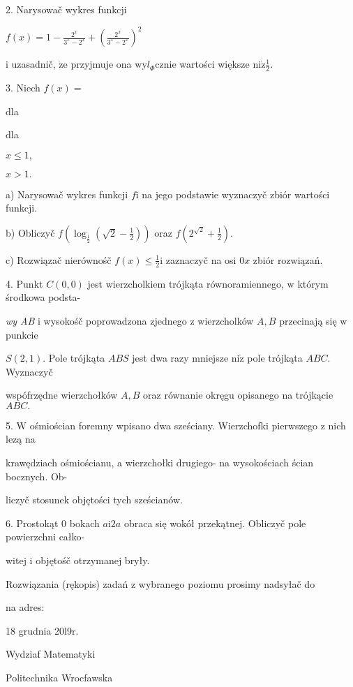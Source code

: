 \documentclass[a4paper,12pt]{article}
\begin{document}
2. Narysowač wykres funkcji

$f(x)=1-\displaystyle \frac{2^{x}}{3^{x}-2^{x}}+(\frac{2^{x}}{3^{x}-2^{x}})^{2}$

$\mathrm{i}$ uzasadnič, $\dot{\mathrm{z}}\mathrm{e}$ przyjmuje ona $\mathrm{w}\mathrm{y}l_{\Phi}$cznie wartości większe $\displaystyle \mathrm{n}\mathrm{i}\dot{\mathrm{z}}\frac{1}{2}.$

3. Niech $f(x)=$

dla

dla

$x\leq 1,$

$x>1.$

a) Narysowač wykres funkcji $f\mathrm{i}$ na jego podstawie wyznaczyč zbiór wartości funkcji.

b) Obliczyč $f(\displaystyle \log_{\frac{1}{2}}(\sqrt{2}-\frac{1}{2}))$ oraz $f(2^{\sqrt{2}}+\displaystyle \frac{1}{2}).$

c) Rozwiązač nierównośč $f(x)\displaystyle \leq\frac{1}{2}\mathrm{i}$ zaznaczyč na osi $0x$ zbiór rozwiązań.

4. Punkt $C(0,0)$ jest wierzcholkiem trójkąta równoramiennego, $\mathrm{w}$ którym środkowa podsta-

{\it wy AB} $\mathrm{i}$ wysokośč poprowadzona zjednego $\mathrm{z}$ wierzcholków $A, B$ przecinają się $\mathrm{w}$ punkcie

$S(2,1)$. Pole trójkąta $ABS$ jest dwa razy mniejsze $\mathrm{n}\mathrm{i}\dot{\mathrm{z}}$ pole trójkąta $ABC$. Wyznaczyč

wspófrzędne wierzchołków $A, B$ oraz równanie okręgu opisanego na trójkącie $ABC.$

5. $\mathrm{W}$ ośmiościan foremny wpisano dwa sześciany. Wierzchofki pierwszego $\mathrm{z}$ nich lezą na

krawędziach ośmiościanu, a wierzchołki drugiego- na wysokościach ścian bocznych. Ob-

liczyč stosunek objętości tych sześcianów.

6. Prostokąt $0$ bokach $a\mathrm{i}2a$ obraca się wokół przekątnej. Obliczyč pole powierzchni całko-

witej $\mathrm{i}$ objętośč otrzymanej bryły.

Rozwiązania (rękopis) zadań z wybranego poziomu prosimy nadsyłač do

na adres:

18 grudnia 20l9r.

Wydziaf Matematyki

Politechnika Wrocfawska
\end{document}
